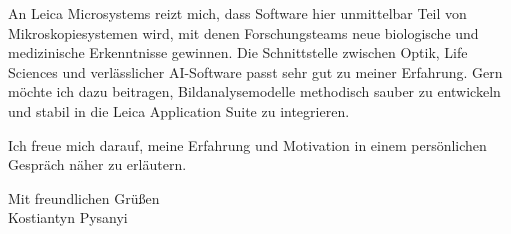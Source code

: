 \documentclass[11pt,a4paper]{article}
\begin{document}
An Leica Microsystems reizt mich, dass Software hier unmittelbar Teil von Mikroskopiesystemen wird, mit denen Forschungsteams neue biologische und medizinische Erkenntnisse gewinnen. Die Schnittstelle zwischen Optik, Life Sciences und verlässlicher AI-Software passt sehr gut zu meiner Erfahrung. Gern möchte ich dazu beitragen, Bildanalysemodelle methodisch sauber zu entwickeln und stabil in die Leica Application Suite zu integrieren.

Ich freue mich darauf, meine Erfahrung und Motivation in einem persönlichen Gespräch näher zu erläutern.

Mit freundlichen Grüßen\\[0.8em]
Kostiantyn Pysanyi
\end{document}

